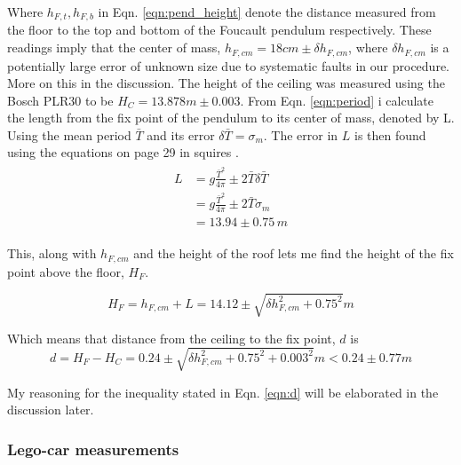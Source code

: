 \documentclass[11pt,a4paper]{article}
\begin{document}
    Where $h_{F, t}, h_{F, b}$ in Eqn. \ref{eqn:pend_height} denote the distance measured from the floor to the top and bottom of the Foucault pendulum respectively. These readings imply that the center of mass, $h_{F, cm} = 18cm \pm \delta h_{F, cm}$, where $\delta h_{F, cm}$ is a potentially large error of unknown size due to systematic faults in our procedure. More on this in the discussion.
    \newline
    \newline
    The height of the ceiling was measured using the Bosch PLR30 to be $H_C = 13.878m \pm 0.003$.
    \newline
    \newline
    From Eqn. \ref{eqn:period} i calculate the length from the fix point of the pendulum to its center of mass, denoted by L. Using the mean period $\bar T$ and its error $\delta \bar T = \sigma_m$. The error in $L$ is then found using the equations on page 29 in squires \cite{squires}.
    \begin{align}
      \begin{split}
      L &= g\frac{\bar T^2}{4\pi} \pm 2\bar T\delta \bar T\\ &= g\frac{\bar T^2}{4\pi} \pm 2\bar T\sigma_m \\&=13.94 \pm 0.75\,m
      \end{split}
    \end{align}

    This, along with $h_{F, cm}$ and the height of the roof lets me find the height of the fix point above the floor, $H_F$.

    \begin{equation}
      H_F = h_{F, cm} + L = 14.12 \pm \sqrt{\delta h_{F, cm}^2 + 0.75^2}m
    \end{equation}

    Which means that distance from the ceiling to the fix point, $d$ is 
    \begin{equation}
      d = H_F - H_C = 0.24 \pm \sqrt{\delta h_{F, cm}^2 + 0.75^2 + 0.003^2}m < 0.24 \pm 0.77m
      \label{eqn:d}
    \end{equation}

    My reasoning for the inequality stated in Eqn. \ref{eqn:d} will be elaborated in the discussion later.

  \subsubsection{Lego-car measurements}
\end{document}
